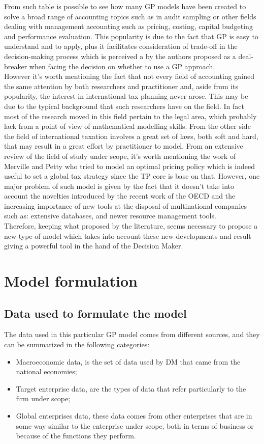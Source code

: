 \documentclass{article}
\begin{document}
From such table is possible to see how many GP models have been created to solve a broad range of accounting topics such as in audit sampling or other fields dealing with management accounting such as pricing, costing, capital budgeting and performance evaluation.
This popularity is due to the fact that GP is easy to understand and to apply, plus it facilitates consideration of trade-off in the decision-making process which is perceived a by the authors proposed as a deal-breaker when facing the decision on whether to use a GP approach.
\\
However it's worth mentioning the fact that not every field of accounting gained the same attention by both researchers and practitioner and, aside from its popularity, the interest in international tax planning never arose. This may be due to the typical background that such researchers have on the field. In fact most of the research moved in this field pertain to the legal area, which probably lack from a point of view of mathematical modelling skills. From the other side the field of international taxation involves a great set of laws, both soft and hard, that may result in a great effort by practitioner to model. 
From an extensive review of the field of study under scope, it’s worth mentioning the work of Merville and Petty\cite{merville_transfer_1978} who tried to model an optimal pricing policy which is indeed useful to set a global tax strategy since the TP core is base on that. However, one major problem of such model is given by the fact that it doesn't take into account the novelties introduced by the recent work of the OECD and the increasing importance of new tools at the disposal of multinational companies such as: extensive databases, and newer resource management tools.
\\
Therefore, keeping what proposed by the literature, seems necessary to propose a new type of model which takes into account these new developments and result giving a powerful tool in the hand of the Decision Maker.

\pagebreak

\section{Model formulation}

\subsection{Data used to formulate the model}
The data used in this particular GP model comes from different sources, and they can be summarized in the following categories:
\begin{itemize}
    \item Macroeconomic data, is the set of data used by DM that came from the national economies;
    \item Target enterprise data, are the types of data that refer particularly to the firm under scope;
    \item Global enterprises data, these data comes from other enterprises that are in some way similar to the enterprise under scope, both in terms of business or because of the functions they perform.
\end{itemize}
\end{document}
